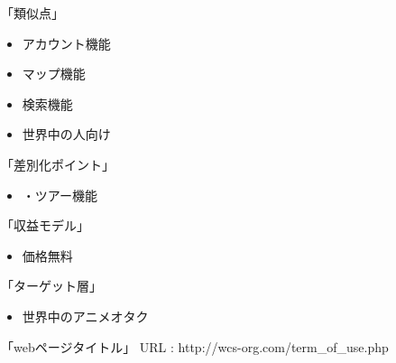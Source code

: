 「類似点」
\begin{itemize}
\item アカウント機能
\item マップ機能
\item 検索機能
\item 世界中の人向け
\end{itemize}
「差別化ポイント」
\begin{itemize}
\item ・ツアー機能
\end{itemize}
「収益モデル」
\begin{itemize}
\item 価格無料
\end{itemize}
「ターゲット層」
\begin{itemize}
\item 世界中のアニメオタク
\end{itemize}
「webページタイトル」
URL : http://wcs-org.com/term_of_use.php

